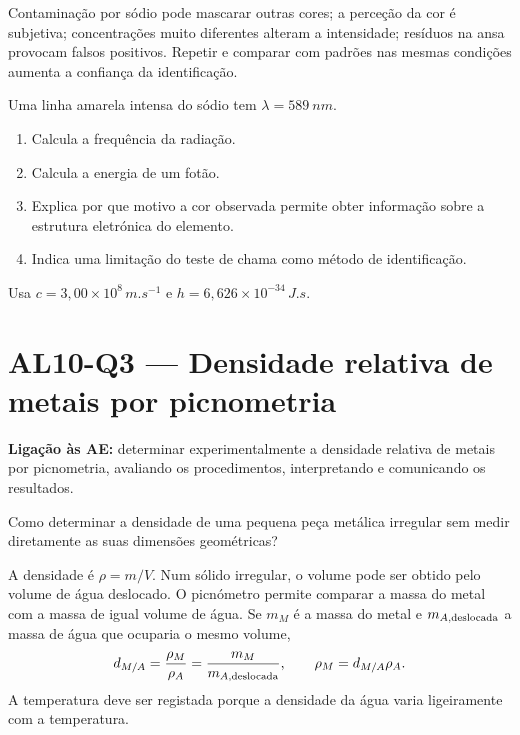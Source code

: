 \documentclass[11pt,a4paper,openany]{book}
\newcounter{exercicio}[chapter]
\renewcommand{\theexercicio}{\thechapter.\arabic{exercicio}}
\newenvironment{exercicio}[1][]%
{\refstepcounter{exercicio}%
\begin{tcolorbox}[breakable,colback=white,colframe=eublue!70,
 title={Exercício \theexercicio\if\relax\detokenize{#1}\relax\else\ --- #1\fi},fonttitle=\bfseries]}%
{\end{tcolorbox}}
\newcommand{\LigAE}[1]{\textbf{Ligação às AE:} #1}
\begin{document}
\begin{erros}
Contaminação por sódio pode mascarar outras cores; a perceção da cor é subjetiva; concentrações muito diferentes alteram a intensidade; resíduos na ansa provocam falsos positivos. Repetir e comparar com padrões nas mesmas condições aumenta a confiança da identificação.
\end{erros}

\begin{exercicio}[Cor, frequência e energia]
Uma linha amarela intensa do sódio tem $\lambda=\SI{589}{nm}$.
\begin{enumerate}[label=\alph*)]
\item Calcula a frequência da radiação.
\item Calcula a energia de um fotão.
\item Explica por que motivo a cor observada permite obter informação sobre a estrutura eletrónica do elemento.
\item Indica uma limitação do teste de chama como método de identificação.
\end{enumerate}
Usa $c=3,00\times10^8\,\si{m.s^{-1}}$ e $h=6,626\times10^{-34}\,\si{J.s}$.
\end{exercicio}

\section{AL10-Q3 — Densidade relativa de metais por picnometria}
\LigAE{determinar experimentalmente a densidade relativa de metais por picnometria, avaliando os procedimentos, interpretando e comunicando os resultados.}

\begin{questao}
Como determinar a densidade de uma pequena peça metálica irregular sem medir diretamente as suas dimensões geométricas?
\end{questao}

\begin{fundamento}
A densidade é $\rho=m/V$. Num sólido irregular, o volume pode ser obtido pelo volume de água deslocado. O picnómetro permite comparar a massa do metal com a massa de igual volume de água. Se $m_M$ é a massa do metal e $m_{A,\rm deslocada}$ a massa de água que ocuparia o mesmo volume,
\[
 d_{M/A}=\frac{\rho_M}{\rho_A}=\frac{m_M}{m_{A,\rm deslocada}},
 \qquad
 \rho_M=d_{M/A}\rho_A.
\]
A temperatura deve ser registada porque a densidade da água varia ligeiramente com a temperatura.
\end{fundamento}
\end{document}
